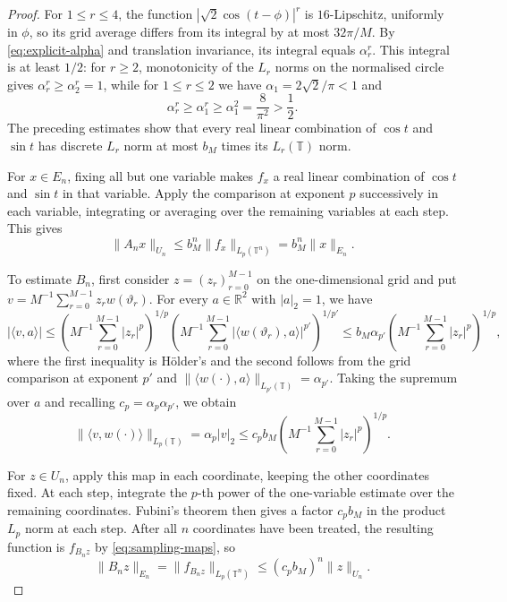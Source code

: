 \documentclass[11pt,a4paper,reqno]{amsart}
\theoremstyle{definition}
\newcommand{\R}{\mathbb R}
\newcommand{\T}{\mathbb T}
\newcommand{\norm}[1]{\lVert #1\rVert}
\numberwithin{equation}{section}
\begin{document}
\begin{proof}
For $1\leq r\leq4$, the function $|\sqrt2\cos(t-\phi)|^r$ is $16$-Lipschitz, uniformly in $\phi$, so its grid average differs from its integral by at most $32\pi/M$. By \eqref{eq:explicit-alpha} and translation invariance, its integral equals $\alpha_r^r$. This integral is at least $1/2$: for $r\geq2$, monotonicity of the $L_r$ norms on the normalised circle gives $\alpha_r^r\geq\alpha_2^r=1$, while for $1\leq r\leq2$ we have $\alpha_1=2\sqrt2/\pi<1$ and
\begin{equation*}
 \alpha_r^r\geq\alpha_1^r\geq\alpha_1^2=\frac8{\pi^2}>\frac12.
\end{equation*}
The preceding estimates show that every real linear combination of $\cos t$ and $\sin t$ has discrete $L_r$ norm at most $b_M$ times its $L_r(\T)$ norm.

For $x\in E_n$, fixing all but one variable makes $f_x$ a real linear combination of $\cos t$ and $\sin t$ in that variable. Apply the comparison at exponent $p$ successively in each variable, integrating or averaging over the remaining variables at each step. This gives
\begin{equation*}
 \norm{A_nx}_{U_n}\leq b_M^n\norm{f_x}_{L_p(\T^n)}=b_M^n\norm{x}_{E_n}.
\end{equation*}

To estimate $B_n$, first consider $z=(z_r)_{r=0}^{M-1}$ on the one-dimensional grid and put $v=M^{-1}\sum_{r=0}^{M-1}z_rw(\vartheta_r)$. For every $a\in\R^2$ with $|a|_2=1$, we have
\begin{equation*}
 |\langle v,a\rangle|
 \leq\left(M^{-1}\sum_{r=0}^{M-1}|z_r|^p\right)^{1/p}
     \left(M^{-1}\sum_{r=0}^{M-1}|\langle w(\vartheta_r),a\rangle|^{p'}\right)^{1/p'}
 \leq b_M\alpha_{p'}\left(M^{-1}\sum_{r=0}^{M-1}|z_r|^p\right)^{1/p},
\end{equation*}
where the first inequality is H\"older's and the second follows from the grid comparison at exponent $p'$ and $\norm{\langle w(\cdot),a\rangle}_{L_{p'}(\T)}=\alpha_{p'}$. Taking the supremum over $a$ and recalling $c_p=\alpha_p\alpha_{p'}$, we obtain
\begin{equation*}
 \norm{\langle v,w(\cdot)\rangle}_{L_p(\T)}
 =\alpha_p|v|_2
 \leq c_pb_M\left(M^{-1}\sum_{r=0}^{M-1}|z_r|^p\right)^{1/p}.
\end{equation*}

For $z\in U_n$, apply this map in each coordinate, keeping the other coordinates fixed. At each step, integrate the $p$-th power of the one-variable estimate over the remaining coordinates. Fubini's theorem then gives a factor $c_pb_M$ in the product $L_p$ norm at each step. After all $n$ coordinates have been treated, the resulting function is $f_{B_nz}$ by \eqref{eq:sampling-maps}, so
\begin{equation*}
 \norm{B_nz}_{E_n}=\norm{f_{B_nz}}_{L_p(\T^n)}
 \leq(c_pb_M)^n\norm z_{U_n}.
\end{equation*}


\end{proof}
\end{document}
